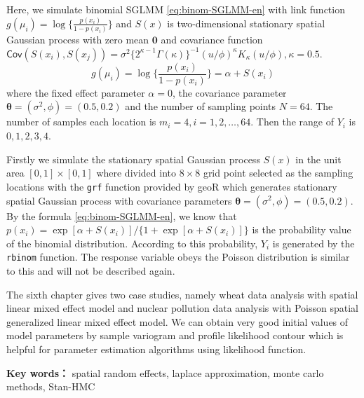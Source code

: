 \documentclass[12pt,a4paper,UTF8,twoside]{book}
\begin{document}
Here, we simulate binomial SGLMM \eqref{eq:binom-SGLMM-en} with link
function \(g(\mu_i) = \log\{\frac{p(x_i)}{1-p(x_i)}\}\) and \(S(x)\) is
two-dimensional stationary spatial Gaussian process with zero mean
\(\mathbf{0}\) and covariance function
\(\mathsf{Cov}(S(x_i),S(x_j)) = \sigma^2 \big\{2^{\kappa-1}\Gamma(\kappa)\big\}^{-1}(u/\phi)^{\kappa}K_{\kappa}(u/\phi), \kappa = 0.5\).
\begin{equation}
g(\mu_i) = \log\big\{\frac{p(x_i)}{1-p(x_i)}\big\} = \alpha + S(x_i) \label{eq:binom-SGLMM-en}
\end{equation} \noindent where the fixed effect parameter
\(\alpha = 0\), the covariance parameter
\(\boldsymbol{\theta} = (\sigma^2, \phi) = (0.5, 0.2)\) and the number
of sampling points \(N = 64\). The number of samples each location is
\(m_i = 4, i = 1, 2, \ldots, 64\). Then the range of \(Y_i\) is
\(0, 1, 2, 3, 4\).

Firstly we simulate the stationary spatial Gaussian process \(S(x)\) in
the unit area \([0,1] \times [0,1]\) where divided into \(8 \times 8\)
grid point selected as the sampling locations with the \texttt{grf}
function provided by geoR which generates stationary spatial Gaussian
process with covariance parameters
\(\boldsymbol{\theta} = (\sigma^2,\phi) = (0.5, 0.2)\). By the formula
\eqref{eq:binom-SGLMM-en}, we know that
\(p(x_i) = \exp[\alpha + S(x_i)]/\{1 + \exp[\alpha + S(x_i)]\}\) is the
probability value of the binomial distribution. According to this
probability, \(Y_i\) is generated by the \texttt{rbinom} function. The
response variable obeys the Poisson distribution is similar to this and
will not be described again.

The sixth chapter gives two case studies, namely wheat data analysis
with spatial linear mixed effect model and nuclear pollution data
analysis with Poisson spatial generalized linear mixed effect model. We
can obtain very good initial values of model parameters by sample
variogram and profile likelihood contour which is helpful for parameter
estimation algorithms using likelihood function.

\medskip

\textbf{Key words：} spatial random effects, laplace approximation,
monte carlo methods, Stan-HMC


\backmatter
\end{document}
